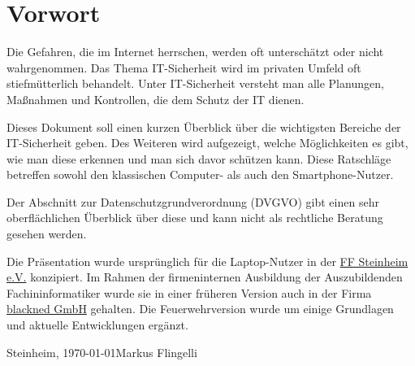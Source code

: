 \section*{Vorwort}
Die Gefahren, die im Internet herrschen, werden oft unterschätzt oder nicht wahrgenommen. Das Thema IT-Sicherheit wird im privaten Umfeld oft stiefmütterlich behandelt. Unter IT-Sicher\-heit versteht man alle Planungen, Maßnahmen und Kontrollen, die dem Schutz der IT dienen.

\vspace{12pt}
Dieses Dokument soll einen kurzen Überblick über die wichtigsten Bereiche der IT-Sicherheit geben.  Des Weiteren wird aufgezeigt, welche Möglichkeiten es gibt, wie man diese erkennen und man sich davor schützen kann. Diese Ratschläge betreffen sowohl den klassischen Com\-puter- als auch den Smartphone-Nutzer.

\vspace{12pt}
Der Abschnitt zur Datenschutzgrundverordnung (DVGVO) gibt einen sehr oberflächlichen Überblick über diese und kann nicht als rechtliche Beratung gesehen werden.

\vspace{12pt}
Die Präsentation wurde ursprünglich für die Laptop-Nutzer in der \href{http://steinheim.ffw-mm.de/}{FF Steinheim e.V.} konzipiert. Im Rahmen der firmeninternen Ausbildung der Auszubildenden Fachininformatiker wurde sie in einer früheren Version auch in der Firma \href{https://www.blackned.de}{blackned GmbH} gehalten. Die Feuerwehrversion wurde um einige Grundlagen und aktuelle Entwicklungen ergänzt.
\vspace{24pt}

Steinheim, \today \hfill Markus Flingelli
\newpage